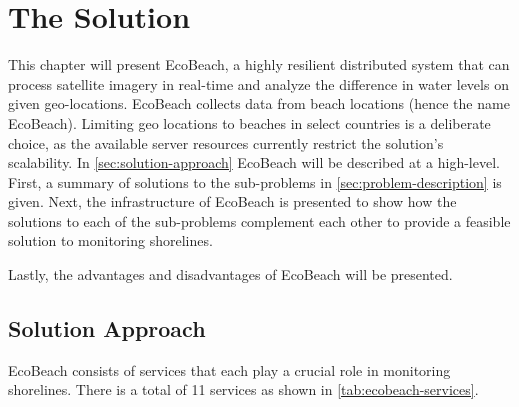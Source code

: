 \chapter{The Solution}

This chapter will present EcoBeach, a highly resilient distributed system that can process satellite imagery in real-time and analyze the difference in water levels on given geo-locations.
EcoBeach collects data from beach locations (hence the name EcoBeach). Limiting geo locations to beaches in select countries is a deliberate choice, as the available server resources currently restrict the solution's scalability. \medbreak
\noindent
In \autoref{sec:solution-approach}  EcoBeach will be described at a high-level. First, a summary of solutions to the sub-problems in \autoref{sec:problem-description} is given. Next, the infrastructure of EcoBeach is presented to show how the solutions to each of the sub-problems complement each other to provide a feasible solution to monitoring shorelines.

Lastly, the advantages and disadvantages of EcoBeach will be presented.

\section{Solution Approach}\label{sec:solution-approach}

EcoBeach consists of services that each play a crucial role in monitoring shorelines. There is a total of 11 services as shown in \autoref{tab:ecobeach-services}.

